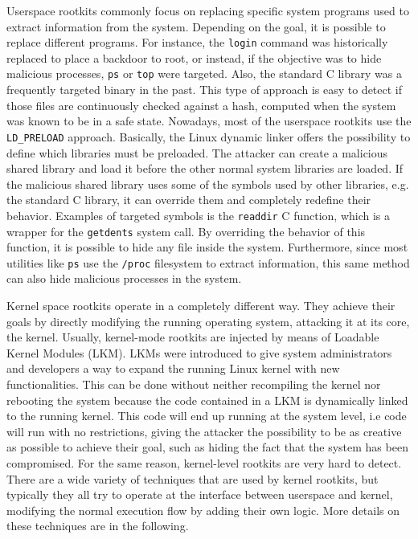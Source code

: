 \par Userspace rootkits commonly focus on replacing specific system programs used to extract information from the system. Depending on the goal, it is possible to replace different programs. For instance, the \texttt{login} command was historically replaced to place a backdoor to root, or instead, if the objective was to hide malicious processes, \texttt{ps} or \texttt{top} were targeted. Also, the standard C library was a frequently targeted binary in the past. This type of approach is easy to detect if those files are continuously checked against a hash, computed when the system was known to be in a safe state. Nowadays, most of the userspace rootkits use the \texttt{LD\_PRELOAD} approach. Basically, the Linux dynamic linker offers the possibility to define which libraries must be preloaded. The attacker can create a malicious shared library and load it before the other normal system libraries are loaded. If the malicious shared library uses some of the symbols used by other libraries, e.g. the standard C library, it can override them and completely redefine their behavior. Examples of targeted symbols is the \texttt{readdir} C function, which is a wrapper for the \texttt{getdents} system call. By overriding the behavior of this function, it is possible to hide any file inside the system. Furthermore, since most utilities like \texttt{ps} use the \texttt{/proc} filesystem to extract information, this same method can also hide malicious processes in the system.
\par Kernel space rootkits operate in a completely different way. They achieve their goals by directly modifying the running operating system, attacking it at its core, the kernel. Usually, kernel-mode rootkits are injected by means of Loadable Kernel Modules (LKM). LKMs were introduced to give system administrators and developers a way to expand the running Linux kernel with new functionalities. This can be done without neither recompiling the kernel nor rebooting the system because the code contained in a LKM is dynamically linked to the running kernel. This code will end up running at the system level, i.e code will run with no restrictions, giving the attacker the possibility to be as creative as possible to achieve their goal, such as hiding the fact that the system has been compromised. For the same reason, kernel-level rootkits are very hard to detect. There are a wide variety of techniques that are used by kernel rootkits, but typically they all try to operate at the interface between userspace and kernel, modifying the normal execution flow by adding their own logic. More details on these techniques are in the following. 

